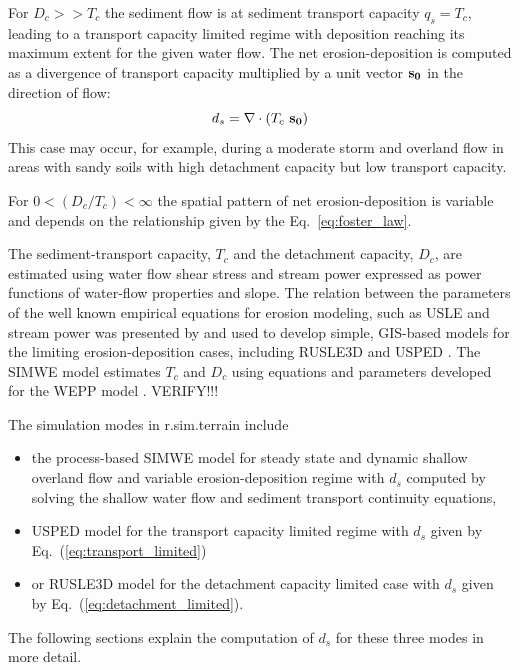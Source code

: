 \documentclass[gmd, manuscript]{copernicus}
\begin{document}
For  $D_c >> T_c$ the sediment flow is at sediment transport capacity $q_s = T_c$, 
leading to a transport capacity limited regime with deposition reaching its maximum
extent for the given water flow. The net erosion-deposition is computed as a divergence of
transport capacity multiplied by a unit vector ${\bf s_0}$ in the direction of flow:
\begin{equation}
\label{eq:transport_limited}
 d_s = \nabla\cdot (T_c ~ {\bf s_0})
\end{equation}
This case may occur, for example, during a moderate storm and overland flow in areas 
with sandy soils with high detachment capacity but low transport capacity.

For $0 < ({D_c / T_c}) < \infty$ the spatial pattern of net erosion-deposition is variable and depends on the 
relationship given by the Eq.~\ref{eq:foster_law}.

The sediment-transport capacity, $T_c $ and the detachment capacity, $D_c $,
are estimated using water flow shear stress and stream power
expressed as power functions of water-flow properties and slope.    
The relation between the parameters of the well known empirical equations for erosion modeling, such as USLE 
and stream power was presented by \citep{Moore1986} and used to develop
simple, GIS-based models for the limiting erosion-deposition cases, including RUSLE3D and USPED \citep{Mitasova2001}.
The SIMWE model estimates $T_c$ and $D_c$ using equations and parameters developed for the WEPP model \citep{Flanagan2013}.
VERIFY!!!

The simulation modes in r.sim.terrain include 
\begin{itemize}
  \item the process-based SIMWE model for steady state and dynamic shallow overland flow 
   and variable erosion-deposition regime with $d_s$ computed 
   by solving the shallow water flow and sediment transport continuity equations,
  \item USPED model for the transport capacity limited regime with $d_s$ given by Eq.~(\ref{eq:transport_limited})
  \item or RUSLE3D model for the detachment capacity limited case with $d_s$ given by Eq.~(\ref{eq:detachment_limited}). 
\end{itemize}
The following sections explain the computation of $d_s$ for these three modes in more detail.
\end{document}
